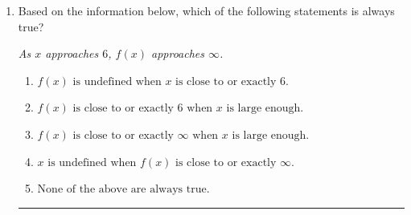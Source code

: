 \documentclass[14pt]{extbook}
\newcommand{\litem}[1]{\item#1\hspace*{-1cm}\rule{\textwidth}{0.4pt}}
\begin{document}
\begin{enumerate}
{\begin{enumerate}[label=\Alph*.]
\end{enumerate} }
\litem{
Based on the information below, which of the following statements is always true?
\begin{center}
    \textit{ As $x$ approaches $6$, $f(x)$ approaches $\infty$. }
\end{center}
\begin{enumerate}[label=\Alph*.]
\item \( f(x) \text{ is undefined when } x \text{ is close to or exactly } 6. \)
\item \( f(x) \text{ is close to or exactly } 6 \text{ when } x \text{ is large enough}. \)
\item \( f(x) \text{ is close to or exactly } \infty \text{ when } x \text{ is large enough}. \)
\item \( x \text{ is undefined when } f(x) \text{ is close to or exactly } \infty. \)
\item \( \text{None of the above are always true.} \)

\end{enumerate} }
\end{enumerate}
\end{document}
